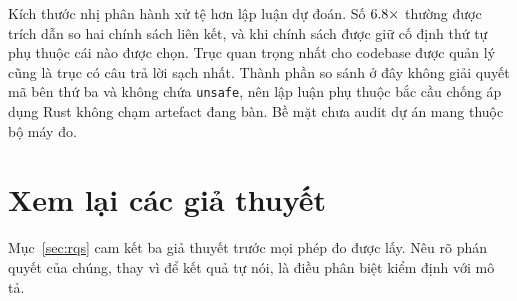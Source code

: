 Kích thước nhị phân hành xử tệ hơn lập luận dự đoán. Số $6.8\times$
thường được trích dẫn so hai chính sách liên kết, và khi chính sách được giữ cố định
thứ tự phụ thuộc cái nào được chọn. Trục quan trọng nhất cho codebase được quản lý
cũng là trục có câu trả lời sạch nhất. Thành phần so sánh ở đây không giải quyết mã bên thứ ba
và không chứa \texttt{unsafe}, nên lập luận phụ thuộc bắc cầu chống áp dụng Rust không
chạm artefact đang bàn. Bề mặt chưa audit dự án mang thuộc
bộ máy đo.

\section{Xem lại các giả thuyết}\label{sec:hypotheses}
Mục~\ref{sec:rqs} cam kết ba giả thuyết trước mọi phép đo
được lấy. Nêu rõ phán quyết của chúng, thay vì để kết quả tự
nói, là điều phân biệt kiểm định với mô tả.

